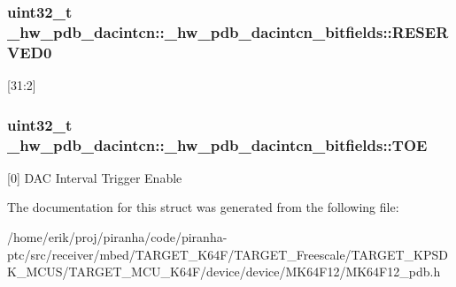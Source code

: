 \subsubsection[{\texorpdfstring{R\+E\+S\+E\+R\+V\+E\+D0}{RESERVED0}}]{\setlength{\rightskip}{0pt plus 5cm}uint32\+\_\+t \+\_\+hw\+\_\+pdb\+\_\+dacintcn\+::\+\_\+hw\+\_\+pdb\+\_\+dacintcn\+\_\+bitfields\+::\+R\+E\+S\+E\+R\+V\+E\+D0}\hypertarget{struct__hw__pdb__dacintcn_1_1__hw__pdb__dacintcn__bitfields_a0328d6f9b6c3afc60e07a19ce7ea6b51}{}\label{struct__hw__pdb__dacintcn_1_1__hw__pdb__dacintcn__bitfields_a0328d6f9b6c3afc60e07a19ce7ea6b51}
\mbox{[}31\+:2\mbox{]} 
\subsubsection[{\texorpdfstring{T\+OE}{TOE}}]{\setlength{\rightskip}{0pt plus 5cm}uint32\+\_\+t \+\_\+hw\+\_\+pdb\+\_\+dacintcn\+::\+\_\+hw\+\_\+pdb\+\_\+dacintcn\+\_\+bitfields\+::\+T\+OE}\hypertarget{struct__hw__pdb__dacintcn_1_1__hw__pdb__dacintcn__bitfields_ae94340eec727b3cc394868dbc9d22be7}{}\label{struct__hw__pdb__dacintcn_1_1__hw__pdb__dacintcn__bitfields_ae94340eec727b3cc394868dbc9d22be7}
\mbox{[}0\mbox{]} D\+AC Interval Trigger Enable 

The documentation for this struct was generated from the following file\+:\begin{DoxyCompactItemize}
\item 
/home/erik/proj/piranha/code/piranha-\/ptc/src/receiver/mbed/\+T\+A\+R\+G\+E\+T\+\_\+\+K64\+F/\+T\+A\+R\+G\+E\+T\+\_\+\+Freescale/\+T\+A\+R\+G\+E\+T\+\_\+\+K\+P\+S\+D\+K\+\_\+\+M\+C\+U\+S/\+T\+A\+R\+G\+E\+T\+\_\+\+M\+C\+U\+\_\+\+K64\+F/device/device/\+M\+K64\+F12/M\+K64\+F12\+\_\+pdb.\+h\end{DoxyCompactItemize}
